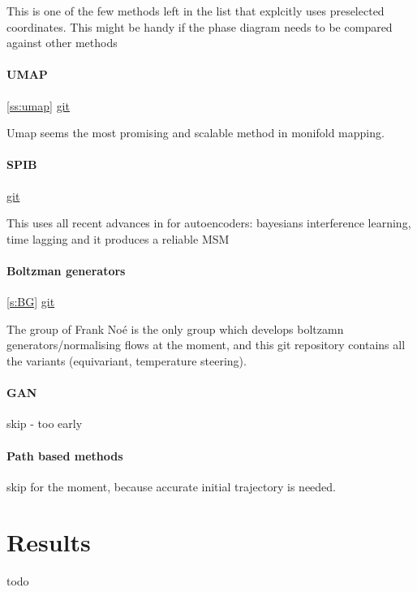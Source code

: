 \documentclass{article}
\begin{document}
This is one of the few methods left in the list that explcitly uses preselected coordinates. This might be handy if the phase diagram needs to be compared against other methods

\paragraph{UMAP} \cref{ss:umap} \href{https://github.com/lmcinnes/umap}{git}

Umap seems the most promising and scalable method in monifold mapping.

\paragraph{SPIB} \cite{Wang2021} \href{https://github.com/tiwarylab/State-Predictive-Information-Bottleneck}{git}

This uses all recent advances in for autoencoders: bayesians interference learning, time lagging and it produces a reliable MSM

\paragraph{Boltzman generators}  \cref{s:BG} \href{https://github.com/noegroup/bgflow}{git}

The group of Frank Noé is the only group which develops boltzamn generators/normalising flows at the moment, and this git repository contains all the variants (equivariant, temperature steering).

\paragraph{GAN} skip - too early

\paragraph{Path based methods} skip for the moment, because accurate initial trajectory is needed.

\section{Results}
todo



\end{document}
